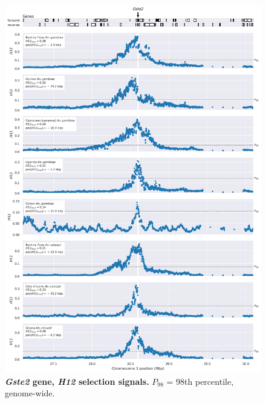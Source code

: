 \documentclass[a4paper,11pt,abstracton,hidelinks]{scrartcl}
\begin{document}
\begin{figure}[t!]
	\begin{center}
		\includegraphics*[width=1\linewidth,center]{artwork/locus_gste2_h12.png}
	\end{center}
	\caption[\textit{Gste2} gene, \textit{H12} selection signals]{
	\textbf{\textit{Gste2} gene, \textit{H12} selection signals.}
	$P_{98}$ = 98th percentile, genome-wide.
	} 
	\label{fig:locus_gste2_h12}
\end{figure}


\clearpage
\end{document}

